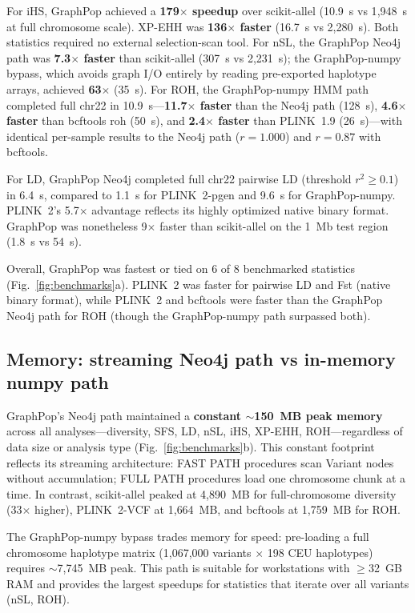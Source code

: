 For iHS, GraphPop achieved a \textbf{179$\times$ speedup} over scikit-allel (10.9~s vs 1{,}948~s at full chromosome scale). XP-EHH was \textbf{136$\times$ faster} (16.7~s vs 2{,}280~s). Both statistics required no external selection-scan tool. For nSL, the GraphPop Neo4j path was \textbf{7.3$\times$ faster} than scikit-allel (307~s vs 2{,}231~s); the GraphPop-numpy bypass, which avoids graph I/O entirely by reading pre-exported haplotype arrays, achieved \textbf{63$\times$} (35~s). For ROH, the GraphPop-numpy HMM path completed full chr22 in 10.9~s---\textbf{11.7$\times$ faster} than the Neo4j path (128~s), \textbf{4.6$\times$ faster} than bcftools roh (50~s), and \textbf{2.4$\times$ faster} than PLINK~1.9 (26~s)---with identical per-sample results to the Neo4j path ($r = 1.000$) and $r = 0.87$ with bcftools.

For LD, GraphPop Neo4j completed full chr22 pairwise LD (threshold $r^2 \geq 0.1$) in 6.4~s, compared to 1.1~s for PLINK~2-pgen and 9.6~s for GraphPop-numpy. PLINK~2's 5.7$\times$ advantage reflects its highly optimized native binary format. GraphPop was nonetheless 9$\times$ faster than scikit-allel on the 1~Mb test region (1.8~s vs 54~s).

Overall, GraphPop was fastest or tied on 6 of 8 benchmarked statistics (Fig.~\ref{fig:benchmarks}a). PLINK~2 was faster for pairwise LD and Fst (native binary format), while PLINK~2 and bcftools were faster than the GraphPop Neo4j path for ROH (though the GraphPop-numpy path surpassed both).

\subsection*{Memory: streaming Neo4j path vs in-memory numpy path}

GraphPop's Neo4j path maintained a \textbf{constant $\sim$150~MB peak memory} across all analyses---diversity, SFS, LD, nSL, iHS, XP-EHH, ROH---regardless of data size or analysis type (Fig.~\ref{fig:benchmarks}b). This constant footprint reflects its streaming architecture: FAST PATH procedures scan Variant nodes without accumulation; FULL PATH procedures load one chromosome chunk at a time. In contrast, scikit-allel peaked at 4{,}890~MB for full-chromosome diversity (33$\times$ higher), PLINK~2-VCF at 1{,}664~MB, and bcftools at 1{,}759~MB for ROH.

The GraphPop-numpy bypass trades memory for speed: pre-loading a full chromosome haplotype matrix (1{,}067{,}000 variants $\times$ 198 CEU haplotypes) requires $\sim$7{,}745~MB peak. This path is suitable for workstations with $\geq$32~GB RAM and provides the largest speedups for statistics that iterate over all variants (nSL, ROH).

